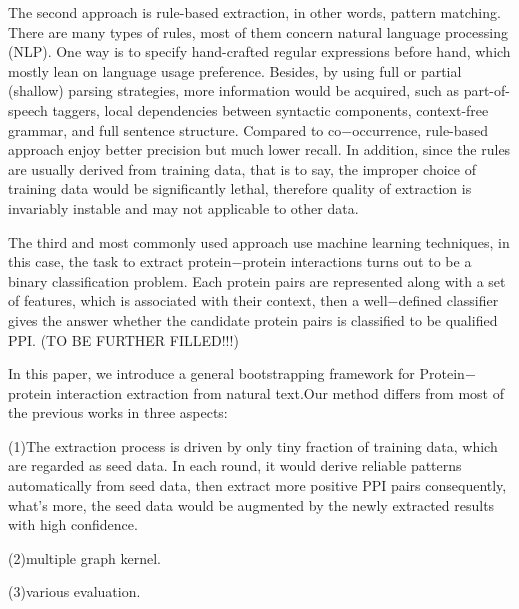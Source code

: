 The second approach is rule-based extraction, in other words, pattern matching. There are many types of rules, most of them concern natural language processing (NLP). One way is to specify hand-crafted regular expressions before hand, which mostly lean on language usage preference. Besides, by using full or partial (shallow) parsing strategies, more information would be acquired, such as part-of-speech taggers, local dependencies between syntactic components, context-free grammar\cite{DBLP:journals/bioinformatics/TemkinG03}, and full sentence structure. Compared to co$-$occurrence, rule-based approach enjoy better precision but much lower recall. In addition, since the rules are usually derived from training data, that is to say, the improper choice of training data would be significantly lethal, therefore quality of extraction is invariably instable and may not applicable to other data.

The third and most commonly used approach use machine learning techniques, in this case, the task to extract protein$-$protein interactions turns out to be a binary classification problem. Each protein pairs are represented along with a set of features, which is associated with their context, then a well$-$defined classifier gives the answer whether the candidate protein pairs is classified to be qualified PPI. (TO BE FURTHER FILLED!!!)

In this paper, we introduce a general bootstrapping framework for Protein$-$protein interaction extraction from natural text.Our method differs from most of the previous works in three aspects:

(1)The extraction process is driven by only tiny fraction of training data, which are regarded as seed data. In each round, it would derive reliable patterns automatically from seed data, then extract more positive PPI pairs consequently, what's more, the seed data would be augmented by the newly extracted results with high confidence.

(2)multiple graph kernel. 

(3)various evaluation.



